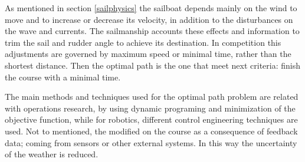 As mentioned in section \ref{sailphysics} the sailboat depends mainly on the wind to move and to increase or decrease its velocity, in addition to the disturbances on the wave and currents.  The sailmanship accounts these effects and information to trim the sail and rudder angle to achieve its destination.  In competition this adjustments are governed by maximum speed or minimal time, rather than the shortest distance. Then the optimal path is the one that meet next criteria: finish the course with a minimal time. \par
The main methods and techniques used for the optimal path problem are related with operations research, by using dynamic programing and minimization of  the objective function, while for robotics, different control engineering techniques are used. Not to mentioned, the modified on the course as a consequence of feedback data; coming from sensors or other external systems.  In this way the uncertainty of the weather is reduced. 



